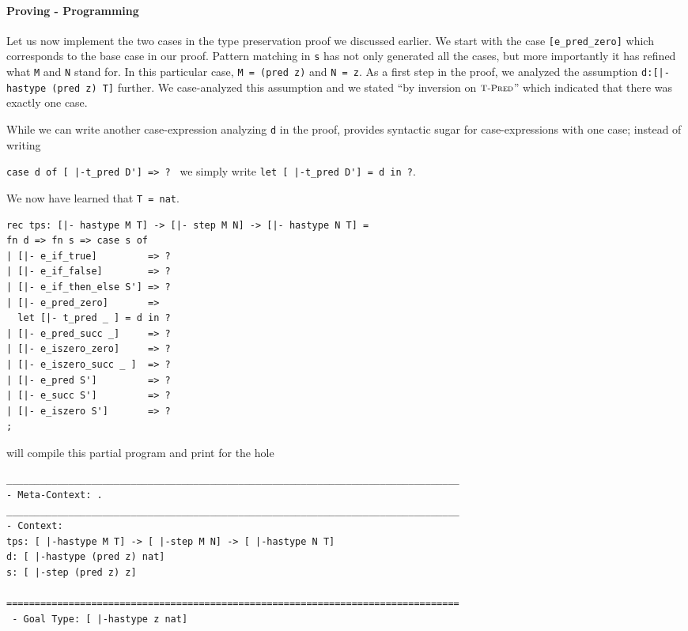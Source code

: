 \paragraph{Proving - Programming} Let us now implement the two cases in the type
preservation proof we discussed earlier. We start with the case
\lstinline![e_pred_zero]! which corresponds to the base case in our proof.
Pattern matching in \lstinline!s! has not only generated all the cases, but more
importantly it has refined what \lstinline!M! and \lstinline!N! stand for. In
this particular case, \lstinline!M = (pred z)! and \lstinline!N = z!. As a first
step in the proof, we analyzed the assumption
\lstinline!d:[|-hastype (pred z) T]! further. We case-analyzed this assumption
and we stated ``by inversion on $\textsc{\footnotesize T-Pred}$'' which indicated that there was
exactly one case.

While we can write another case-expression analyzing \lstinline!d! in the proof,
\beluga provides syntactic sugar for case-expressions with one case; instead of
writing

\noindent
\lstinline!case d of [ |-t_pred D'] => ? ! we simply write
\lstinline!let [ |-t_pred D'] = d in ?!.

\noindent
We now have learned that \lstinline!T = nat!.

\begin{lstlisting}
rec tps: [|- hastype M T] -> [|- step M N] -> [|- hastype N T] =
fn d => fn s => case s of
| [|- e_if_true]         => ?
| [|- e_if_false]        => ?
| [|- e_if_then_else S'] => ?
| [|- e_pred_zero]       =>
  let [|- t_pred _ ] = d in ?
| [|- e_pred_succ _]     => ?
| [|- e_iszero_zero]     => ?
| [|- e_iszero_succ _ ]  => ?
| [|- e_pred S']         => ?
| [|- e_succ S']         => ?
| [|- e_iszero S']       => ?
;
\end{lstlisting}

\beluga will compile this partial program and print for the hole

\begin{lstlisting}
________________________________________________________________________________
- Meta-Context: .
________________________________________________________________________________
- Context:
tps: [ |-hastype M T] -> [ |-step M N] -> [ |-hastype N T]
d: [ |-hastype (pred z) nat]
s: [ |-step (pred z) z]

================================================================================
 - Goal Type: [ |-hastype z nat]
\end{lstlisting}

